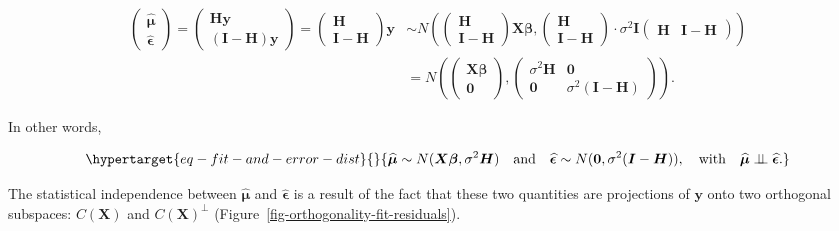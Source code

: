 \documentclass[
  11pt,
  letterpaper,
  oneside]{book}
\theoremstyle{definition}
\theoremstyle{plain}
\theoremstyle{plain}
\theoremstyle{plain}
\theoremstyle{remark}
\begin{document}
\[
\begin{split}
\begin{pmatrix} \boldsymbol{\widehat{\mu}} \\ \boldsymbol{\widehat{\epsilon}} \end{pmatrix} = \begin{pmatrix} \boldsymbol{H} \boldsymbol{y} \\ (\boldsymbol{I} - \boldsymbol{H}) \boldsymbol{y} \end{pmatrix} = \begin{pmatrix} \boldsymbol{H} \\ \boldsymbol{I} - \boldsymbol{H} \end{pmatrix}\boldsymbol{y} &\sim N\left(\begin{pmatrix} \boldsymbol{H} \\ \boldsymbol{I} - \boldsymbol{H} \end{pmatrix}\boldsymbol{X} \boldsymbol{\beta}, \begin{pmatrix} \boldsymbol{H} \\ \boldsymbol{I} - \boldsymbol{H} \end{pmatrix}\cdot \sigma^2 \boldsymbol{I} \begin{pmatrix} \boldsymbol{H} & \boldsymbol{I} - \boldsymbol{H} \end{pmatrix}\right) \\
&= N\left(\begin{pmatrix} \boldsymbol{X} \boldsymbol{\beta} \\ \boldsymbol{0} \end{pmatrix}, \begin{pmatrix} \sigma^2 \boldsymbol{H} & \boldsymbol{0} \\ \boldsymbol{0} & \sigma^2(\boldsymbol{I} - \boldsymbol{H}) \end{pmatrix} \right).
\end{split}
\]

In other words,

\begin{equation}\protect\hypertarget{eq-fit-and-error-dist}{}{
\boldsymbol{\widehat{\mu}} \sim N(\boldsymbol{X} \boldsymbol{\beta}, \sigma^2 \boldsymbol{H}) \quad \text{and} \quad \boldsymbol{\widehat{\epsilon}} \sim N(\boldsymbol{0}, \sigma^2(\boldsymbol{I} - \boldsymbol{H})), \quad \text{with} \quad \boldsymbol{\widehat{\mu}} \perp\!\!\!\perp \boldsymbol{\widehat{\epsilon}}.
}\label{eq-fit-and-error-dist}\end{equation}

The statistical independence between \(\boldsymbol{\widehat{\mu}}\) and
\(\boldsymbol{\widehat{\epsilon}}\) is a result of the fact that these
two quantities are projections of \(\boldsymbol{y}\) onto two orthogonal
subspaces: \(C(\boldsymbol{X})\) and \(C(\boldsymbol{X})^\perp\)
(Figure~\ref{fig-orthogonality-fit-residuals}).
\end{document}
